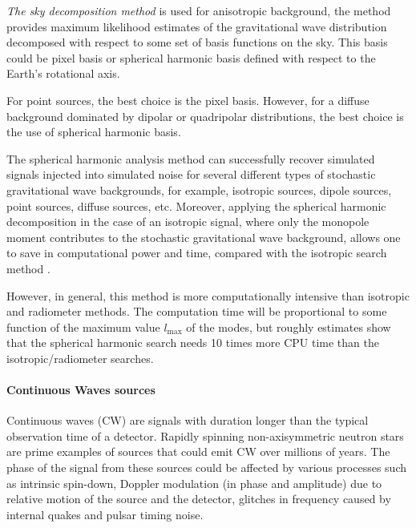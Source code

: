 {\em The sky decomposition method} is used for anisotropic 
background, the method provides maximum likelihood estimates 
of the gravitational wave distribution decomposed with 
respect to some set of basis functions on the sky. This 
basis could be pixel basis or spherical harmonic basis 
defined with respect to the Earth's rotational axis.

For point sources, the best choice is the pixel basis. 
However, for a diffuse background dominated by dipolar 
or quadripolar distributions, the best choice is the 
use of spherical harmonic basis. 

The spherical harmonic analysis method can successfully 
recover simulated signals injected into simulated noise 
for several different types of stochastic gravitational 
wave backgrounds, for example, isotropic sources, dipole 
sources, point sources, diffuse sources, etc. Moreover,  
applying the spherical harmonic decomposition   in the 
case of an isotropic signal, where only the monopole 
moment contributes to the stochastic gravitational wave 
background,  allows one to save in 
computational power and time, compared with the isotropic 
search method \cite{THRANE2009}.

However, in general,  this method is more computationally 
intensive than isotropic and radiometer methods.  The 
computation time will be proportional to some function 
of the maximum value $l_\text{max}$ of the modes, but 
roughly estimates show that the spherical harmonic search 
needs 10 times more CPU time than the isotropic/radiometer 
searches.


\paragraph{Continuous Waves sources} 
Continuous waves (CW) are signals with duration longer than 
the typical observation time of a detector. Rapidly spinning 
non-axisymmetric neutron stars are prime examples of sources 
that could emit CW over millions of years. The phase of the
signal from these sources could be affected by various processes such
as intrinsic spin-down, Doppler modulation (in phase and amplitude)
due to relative motion of the source and the detector,  
glitches in frequency caused by internal quakes and pulsar
timing noise.  

